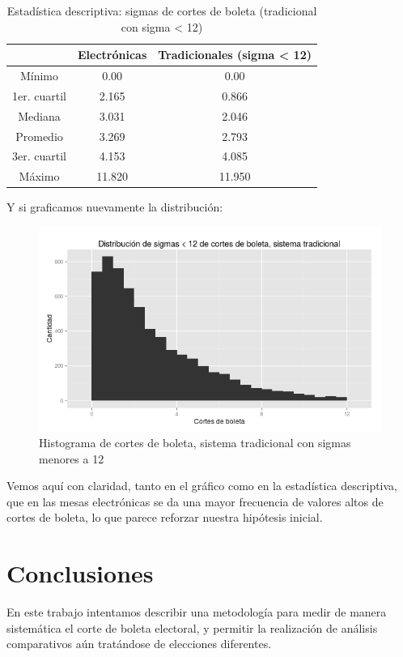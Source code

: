 \documentclass[12pt,a4paper]{article}
\begin{document}
\begin{table}[h!]
\centering
\label{my-label}
\begin{tabular}{c c c}
 & Electrónicas & Tradicionales (sigma < 12) \\
\hline
Mínimo & 0.00 & 0.00 \\
1er. cuartil & 2.165 & 0.866 \\
Mediana & 3.031 & 2.046 \\
Promedio & 3.269 & 2.793 \\
3er. cuartil & 4.153 & 4.085 \\
Máximo & 11.820 & 11.950 \\
\hline
\end{tabular}
\caption{Estadística descriptiva: sigmas de cortes de boleta (tradicional con
  sigma < 12)}
\label{table:1}
\end{table}

Y si graficamos nuevamente la distribución:

\begin{figure}[h]
\centering
    \includegraphics[width=\textwidth]{sigmas_tradicional_menor_a_12}
\caption{Histograma de cortes de boleta, sistema tradicional con sigmas menores
  a 12}
\end{figure}

Vemos aquí con claridad, tanto en el gráfico como en la estadística descriptiva,
que en las mesas electrónicas se da una mayor frecuencia de valores altos de
cortes de boleta, lo que parece reforzar nuestra hipótesis inicial.

\section{Conclusiones}
En este trabajo intentamos describir una metodología para medir de manera
sistemática el corte de boleta electoral, y permitir la realización de análisis
comparativos aún tratándose de elecciones diferentes.
\end{document}

